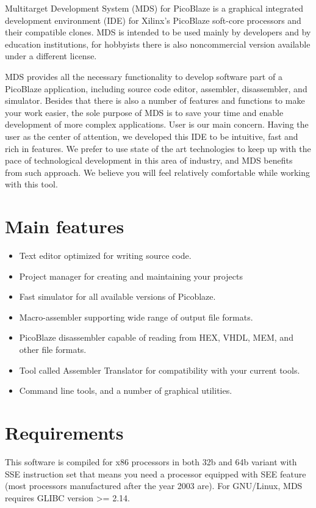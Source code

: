 Multitarget Development System (MDS) for PicoBlaze is a graphical integrated development environment (IDE) for Xilinx's PicoBlaze soft-core processors and their compatible clones. MDS is intended to be used mainly by developers and by education institutions, for hobbyists there is also noncommercial version available under a different license.

MDS provides all the necessary functionality to develop software part of a PicoBlaze application, including source code editor, assembler, disassembler, and simulator. Besides that there is also a number of features and functions to make your work easier, the sole purpose of MDS is to save your time and enable development of more complex applications. User is our main concern. Having the user as the center of attention, we developed this IDE to be intuitive, fast and rich in features. We prefer to use state of the art technologies to keep up with the pace of technological development in this area of industry, and MDS benefits from such approach. We believe you will feel relatively comfortable while working with this tool.

\section{Main features}
    \begin{itemize}
        \item Text editor optimized for writing source code.
        \item Project manager for creating and maintaining your projects
        \item Fast simulator for all available versions of Picoblaze.
        \item Macro-assembler supporting wide range of output file formats.
        \item PicoBlaze disassembler capable of reading from HEX, VHDL, MEM, and other file formats.
        \item Tool called Assembler Translator for compatibility with your current tools.
        \item Command line tools, and a number of graphical utilities.
    \end{itemize}

\clearpage
\section{Requirements}
    This software is compiled for x86 processors in both 32b and 64b variant with SSE instruction set that means you
    need a processor equipped with SEE feature (most processors manufactured after the year 2003 are). For GNU/Linux,
    MDS requires GLIBC version >= 2.14.

